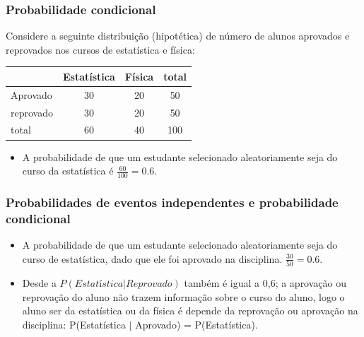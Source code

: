 \begin{frame}
\frametitle{Probabilidade condicional}
\justifying
Considere a seguinte distribuição (hipotética) de número de alunos aprovados e reprovados nos cursos de estatística e física:

{\small
\begin{center}
\begin{tabular}{l | c c | c}

			& Estatística	& Física	& total \\
\hline
Aprovado		& 30		& 20		& 50 \\
reprovado			& 30		& 20		& 50 \\
\hline
total			& 60		& 40		& 100
\end{tabular}
\end{center}
}

\pause

\begin{itemize}
\justifying
\item A probabilidade de que um estudante selecionado aleatoriamente seja do curso da estatística é \pause $\frac{60}{100} = 0.6$. 
\end{itemize}
\end{frame}

\begin{frame}
\frametitle{Probabilidades de eventos independentes e probabilidade condicional}
\pause
\justifying
\begin{itemize}
\justifying
\item A probabilidade de que um estudante selecionado aleatoriamente seja do curso de estatística, dado que ele foi aprovado na disciplina. \pause $\frac{30}{50} = 0.6$. 

\pause
\justifying
\item Desde a $P(Estatística| Reprovado)$ também é igual a 0,6; a aprovação ou reprovação do aluno não trazem informação sobre o curso do aluno, logo o aluno ser da estatística ou da física é depende da reprovação ou aprovação na disciplina: P(Estatística $|$ Aprovado) = P(Estatística).

\end{itemize}

\end{frame}


